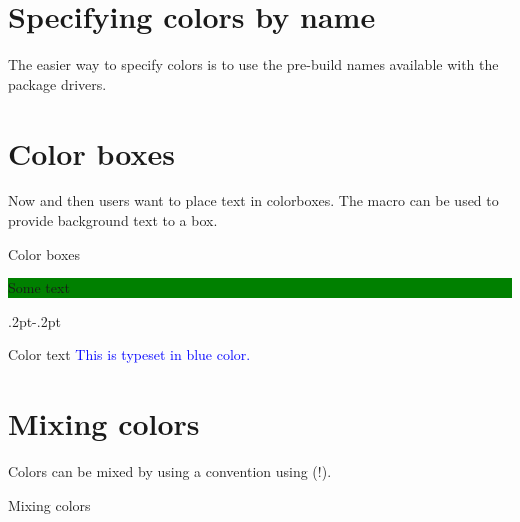 \documentclass{article}
\begin{document}
\section{Specifying colors by name}

The easier way to specify colors is to use the pre-build names available
with the package drivers.


\section{Color boxes}

Now and then users want to place text in colorboxes. The macro  can be used to provide background text to a box.



\begin{texexample}{Color boxes}{}
\colorbox{green}{\begin{minipage}{3cm}
  Some text
\end{minipage}}

\fboxrule.2pt\fboxsep-.2pt
\end{texexample}


\begin{texexample}{Color text}{}
\textcolor{blue}{This is typeset in blue color.}

\end{texexample}

\section{Mixing colors}

Colors can be mixed by using a convention using (!).

\begin{texexample}{Mixing colors}{}
\color{blue!40!yellow}
\lorem
\end{texexample}
\end{document}
